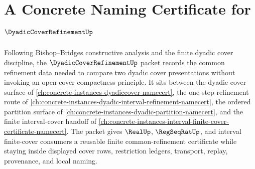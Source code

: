 \chapter{A Concrete Naming Certificate for $\DyadicCoverRefinementUp$}
\label{ch:concrete-instances-dyadic-cover-refinement-namecert}

Following Bishop--Bridges constructive analysis and the finite dyadic cover discipline, the $\DyadicCoverRefinementUp$ packet records the common refinement data needed to compare two dyadic cover presentations without invoking an open-cover compactness principle. It sits between the dyadic cover surface of \autoref{ch:concrete-instances-dyadiccover-namecert}, the one-step refinement route of \autoref{ch:concrete-instances-dyadic-interval-refinement-namecert}, the ordered partition surface of \autoref{ch:concrete-instances-dyadic-partition-namecert}, and the finite interval-cover handoff of \autoref{ch:concrete-instances-interval-finite-cover-certificate-namecert}. The packet gives $\RealUp$, $\RegSeqRatUp$, and interval finite-cover consumers a reusable finite common-refinement certificate while staying inside displayed cover rows, restriction ledgers, transport, replay, provenance, and local naming.

